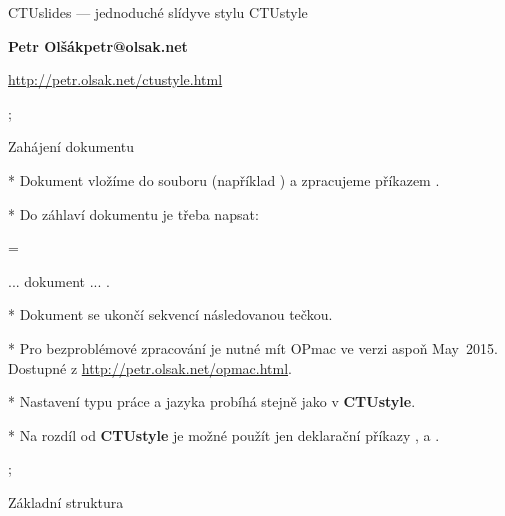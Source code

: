 

\worktype[O/CZ]

\slideshow 

\tit CTUslides ---\nl 
     jednoduché slídy\nl ve stylu CTUstyle

\subtit\bf Petr Olšák\nl petr@olsak.net

\subtit\rm \url{http://petr.olsak.net/ctustyle.html}

\pg; %

\sec Zahájení dokumentu

* Dokument vložíme do souboru (například )\nl
  a zpracujeme příkazem .

* Do záhlaví dokumentu je třeba napsat:

\pg=\typosize[13/15]\begtt
\worktype[B/CZ]   %

\slideshow        %
... dokument ...
\pg.
\endtt

* Dokument se ukončí sekvencí \code{\\pg} následovanou tečkou.

* Pro bezproblémové zpracování je nutné mít OPmac ve verzi aspoň May~2015.
  Dostupné z \url{http://petr.olsak.net/opmac.html}.

* Nastavení typu práce a jazyka probíhá stejně jako v {\bf\Blue CTUstyle}.

* Na rozdíl od {\bf\Blue CTUstyle} je možné použít jen deklarační
  příkazy \code{\\worktype}, \code{\\faculty} a \code{\\department}.

\pg; %

\sec Základní struktura


